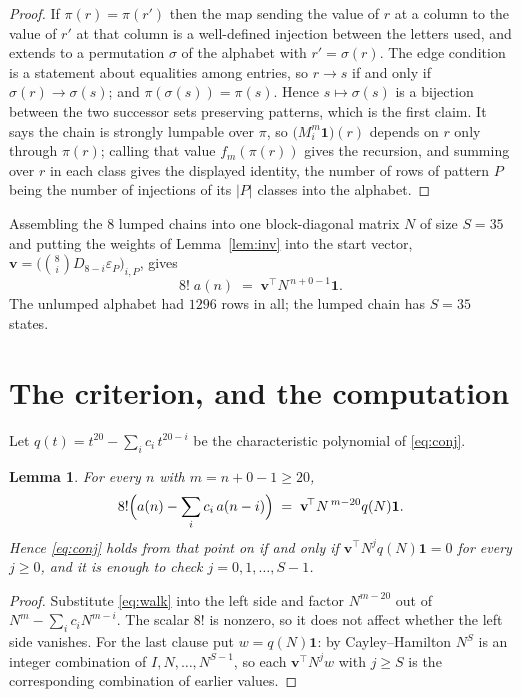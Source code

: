 \documentclass[11pt,a4paper]{article}
\theoremstyle{plain}
\newtheorem{lemma}[theorem]{Lemma}
\theoremstyle{definition}
\begin{document}
\begin{proof}
If $\pi(r)=\pi(r')$ then the map sending the value of $r$ at a column to the value of $r'$
at that column is a well-defined injection between the letters used, and extends to a
permutation $\sigma$ of the alphabet with $r'=\sigma(r)$. The edge condition is a statement
about equalities among entries, so $r\to s$ if and only if $\sigma(r)\to\sigma(s)$; and
$\pi(\sigma(s))=\pi(s)$. Hence $s\mapsto\sigma(s)$ is a bijection between the two successor
sets preserving patterns, which is the first claim. It says the chain is strongly lumpable
over $\pi$, so $\bigl(M_i^{m}\mathbf{1}\bigr)(r)$ depends on $r$ only through $\pi(r)$;
calling that value $f_m(\pi(r))$ gives the recursion, and summing over $r$ in each class
gives the displayed identity, the number of rows of pattern $P$ being the number of
injections of its $|P|$ classes into the alphabet.
\end{proof}

Assembling the $8$ lumped chains into one block-diagonal matrix $N$ of size $S=35$ and
putting the weights of Lemma~\ref{lem:inv} into the start vector,
$\mathbf{v}=\bigl(\binom{8}{i}D_{8-i}\varepsilon_P\bigr)_{i,P}$, gives
\begin{equation}\label{eq:walk}
8!\;a(n)\;=\;\mathbf{v}^{\!\top}N^{\,n+0-1}\mathbf{1} .
\end{equation}
The unlumped alphabet had $1296$ rows in all; the lumped chain has $S=35$ states.

\section{The criterion, and the computation}

Let $q(t)=t^{20}-\sum_i c_i\,t^{20-i}$ be the characteristic polynomial of
\eqref{eq:conj}.

\begin{lemma}\label{lem:crit}
For every $n$ with $m=n+0-1\ge20$,
\[
8!\Bigl(a(n)-\sum_i c_i\,a(n-i)\Bigr)\;=\;\mathbf{v}^{\!\top}N^{\,m-20}q(N)\mathbf{1} .
\]
Hence \eqref{eq:conj} holds from that point on if and only if
$\mathbf{v}^{\!\top}N^{j}q(N)\mathbf{1}=0$ for every $j\ge0$, and it is enough to check
$j=0,1,\dots,S-1$.
\end{lemma}

\begin{proof}
Substitute \eqref{eq:walk} into the left side and factor $N^{m-20}$ out of
$N^{m}-\sum_i c_iN^{m-i}$. The scalar $8!$ is nonzero, so it does not affect whether
the left side vanishes. For the last clause put $w=q(N)\mathbf{1}$: by Cayley--Hamilton
$N^{S}$ is an integer combination of $I,N,\dots,N^{S-1}$, so each
$\mathbf{v}^{\!\top}N^{j}w$ with $j\ge S$ is the corresponding combination of earlier
values.
\end{proof}
\end{document}
